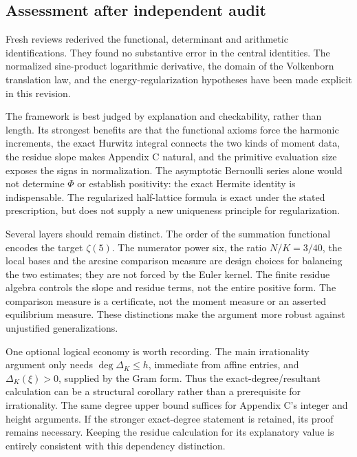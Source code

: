 \documentclass[11pt]{article}
\theoremstyle{definition}
\theoremstyle{remark}\newtheorem*{remark}{Remark}
\begin{document}
\subsection*{Assessment after independent audit}
Fresh reviews rederived the functional, determinant and arithmetic
identifications. They found no substantive error in the central identities.
The normalized sine-product logarithmic derivative, the domain of the
Volkenborn translation law, and the energy-regularization hypotheses have
been made explicit in this revision.

The framework is best judged by explanation and checkability, rather than
length. Its strongest benefits are that the functional axioms force the
harmonic increments, the exact Hurwitz integral connects the two kinds of
moment data, the residue slope makes Appendix C natural, and the primitive
evaluation size exposes the signs in normalization. The asymptotic Bernoulli
series alone would not determine $\Phi$ or establish positivity: the exact
Hermite identity is indispensable. The regularized half-lattice formula is
exact under the stated prescription, but does not supply a new uniqueness
principle for regularization.

Several layers should remain distinct. The order of the summation functional
encodes the target $\zeta(5)$. The numerator power six, the ratio $N/K=3/40$,
the local bases and the arcsine comparison measure are design choices for
balancing the two estimates; they are not forced by the Euler kernel.
The finite residue algebra controls the slope and residue terms, not the
entire positive form. The comparison measure is a certificate, not the
moment measure or an asserted equilibrium measure. These distinctions make
the argument more robust against unjustified generalizations.

One optional logical economy is worth recording. The main irrationality
argument only needs $\deg\Delta_K\le h$, immediate from affine entries, and
$\Delta_K(\xi)>0$, supplied by the Gram form. Thus the exact-degree/resultant
calculation can be a structural corollary rather than a prerequisite for
irrationality. The same degree upper bound suffices for Appendix C's integer
and height arguments. If the stronger exact-degree statement is retained,
its proof remains necessary. Keeping the residue calculation for its
explanatory value is entirely consistent with this dependency distinction.
\end{document}
